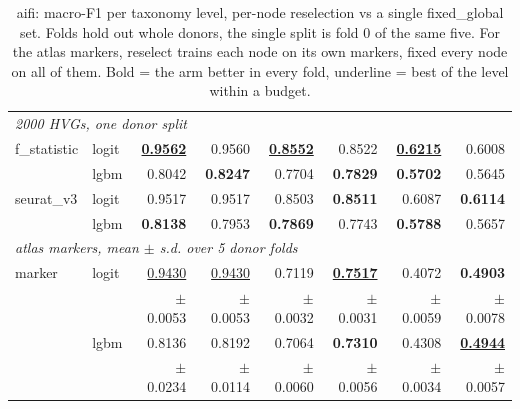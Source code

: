 \begin{table}[t]
\begin{tabular}{llrrrrrr}
\midrule
\multicolumn{8}{l}{\emph{2000 HVGs, one donor split}} \\
f\_statistic & logit & \underline{\textbf{0.9562}} & 0.9560 & \underline{\textbf{0.8552}} & 0.8522 & \underline{\textbf{0.6215}} & 0.6008 \\
 & lgbm & 0.8042 & \textbf{0.8247} & 0.7704 & \textbf{0.7829} & \textbf{0.5702} & 0.5645 \\
\addlinespace
seurat\_v3 & logit & 0.9517 & 0.9517 & 0.8503 & \textbf{0.8511} & 0.6087 & \textbf{0.6114} \\
 & lgbm & \textbf{0.8138} & 0.7953 & \textbf{0.7869} & 0.7743 & \textbf{0.5788} & 0.5657 \\
\midrule
\multicolumn{8}{l}{\emph{atlas markers, mean $\pm$ s.d. over 5 donor folds}} \\
marker & logit & \underline{0.9430} & \underline{0.9430} & 0.7119 & \underline{\textbf{0.7517}} & 0.4072 & \textbf{0.4903} \\
 &  & {\scriptsize$\pm$0.0053} & {\scriptsize$\pm$0.0053} & {\scriptsize$\pm$0.0032} & {\scriptsize$\pm$0.0031} & {\scriptsize$\pm$0.0059} & {\scriptsize$\pm$0.0078} \\[1pt]
 & lgbm & 0.8136 & 0.8192 & 0.7064 & \textbf{0.7310} & 0.4308 & \underline{\textbf{0.4944}} \\
 &  & {\scriptsize$\pm$0.0234} & {\scriptsize$\pm$0.0114} & {\scriptsize$\pm$0.0060} & {\scriptsize$\pm$0.0056} & {\scriptsize$\pm$0.0034} & {\scriptsize$\pm$0.0057} \\[1pt]
\bottomrule
\end{tabular}
\caption{aifi: macro-F1 per taxonomy level, per-node reselection vs a single fixed\_global set. Folds hold out whole donors, the single split is fold 0 of the same five. For the atlas markers, reselect trains each node on its own markers, fixed every node on all of them. Bold = the arm better in every fold, underline = best of the level within a budget.}
\label{tab:comparison-aifi-macrof1}
\end{table}